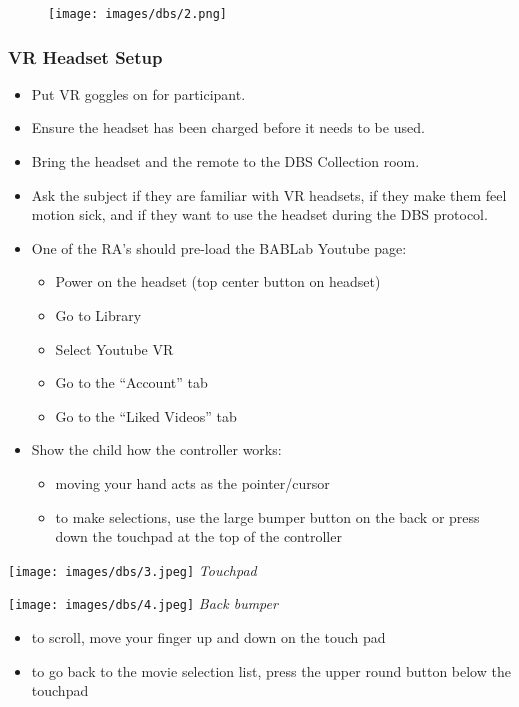 \documentclass[
]{book}
\providecommand{\tightlist}{%
  \setlength{\itemsep}{0pt}\setlength{\parskip}{0pt}}
\begin{document}
\begin{figure}
\centering
\texttt{[image: images/dbs/2.png]}
\caption{}
\end{figure}

\hypertarget{vr-headset-setup}{%
\subsubsection{VR Headset Setup}\label{vr-headset-setup}}

\begin{itemize}
\tightlist
\item
  Put VR goggles on for participant.
\item
  Ensure the headset has been charged before it needs to be used.
\item
  Bring the headset and the remote to the DBS Collection room.
\item
  Ask the subject if they are familiar with VR headsets, if they make them feel motion sick, and if they want to use the headset during the DBS protocol.
\item
  One of the RA's should pre-load the BABLab Youtube page:

  \begin{itemize}
  \tightlist
  \item
    Power on the headset (top center button on headset)
  \item
    Go to Library
  \item
    Select Youtube VR
  \item
    Go to the ``Account'' tab
  \item
    Go to the ``Liked Videos'' tab
  \end{itemize}
\item
  Show the child how the controller works:

  \begin{itemize}
  \tightlist
  \item
    moving your hand acts as the pointer/cursor
  \item
    to make selections, use the large bumper button on the back or press down the touchpad at the top of the controller
  \end{itemize}
\end{itemize}

\texttt{[image: images/dbs/3.jpeg]} \emph{Touchpad}

\texttt{[image: images/dbs/4.jpeg]} \emph{Back bumper}

\begin{itemize}
\tightlist
\item
  to scroll, move your finger up and down on the touch pad
\item
  to go back to the movie selection list, press the upper round button below the touchpad
\end{itemize}
\end{document}
